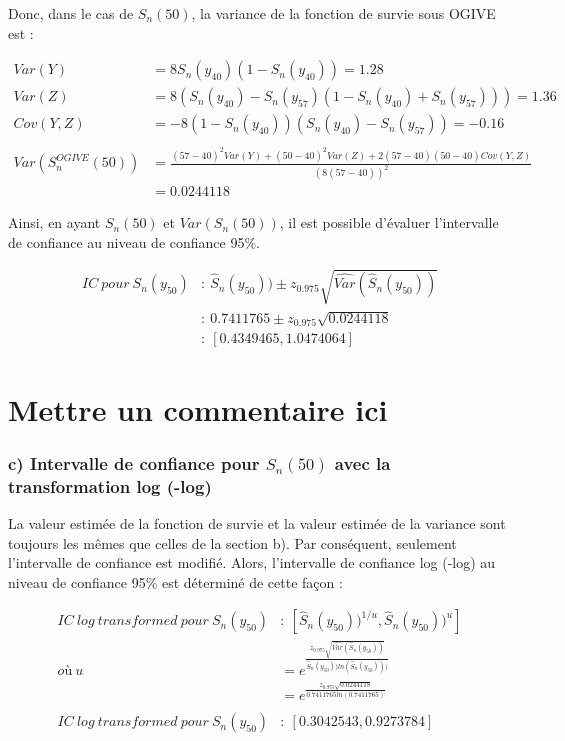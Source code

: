 \documentclass[]{article}
\begin{document}
Donc, dans le cas de \(S_n(50)\), la variance de la fonction de survie
sous OGIVE est :

\begin{align*}
    Var(Y) 
    &= 8 S_n(y_{40}) (1 - S_n(y_{40})) = 1.28 \\
    Var(Z)
    &= 8 (S_n(y_{40}) - S_n(y_{57}) (1 - S_n(y_{40}) + S_n(y_{57}))) = 1.36\\
    Cov(Y,Z)
    &= -8 (1 - S_n(y_{40})) (S_n(y_{40}) - S_n(y_{57})) = -0.16 \\
    \\
    Var(S_n^{OGIVE}(50))
    &= \frac{(57-40)^2Var(Y) + (50-40)^2Var(Z) + 2(57-40)(50-40)Cov(Y,Z)}{(8(57-40))^2} \\
    &= 0.0244118
\end{align*}

\newpage

Ainsi, en ayant \(S_n(50)\) et \(Var(S_n(50))\), il est possible
d'évaluer l'intervalle de confiance au niveau de confiance 95\%.

\begin{align*}
    IC \ pour \ S_n(y_{50})
    &: \ \hat{S}_n(y_{50})) \pm z_{0.975} \sqrt{\widehat{Var}(\hat{S}_n(y_{50}))}\\
    &: \ 0.7411765 \pm z_{0.975} \sqrt{0.0244118} \\
    &: \ [0.4349465, 1.0474064]
\end{align*}

\section{Mettre un commentaire ici}\label{mettre-un-commentaire-ici}

\subsubsection{\texorpdfstring{c) Intervalle de confiance pour
\(S_n(50)\) avec la transformation log
(-log)}{c) Intervalle de confiance pour S\_n(50) avec la transformation log (-log)}}\label{c-intervalle-de-confiance-pour-s_n50-avec-la-transformation-log--log}

La valeur estimée de la fonction de survie et la valeur estimée de la
variance sont toujours les mêmes que celles de la section b). Par
conséquent, seulement l'intervalle de confiance est modifié. Alors,
l'intervalle de confiance log (-log) au niveau de confiance 95\% est
déterminé de cette façon :

\begin{align*}
    IC \ log \ transformed \ pour \ S_n(y_{50})
    &: \ [\hat{S}_n(y_{50}))^{1/u} , \hat{S}_n(y_{50}))^{u}] \\
    où \ u
    &= e^{\frac{z_{0.975} \sqrt{\hat{Var}(\hat{S}_n(y_{50}))}}{\hat{S}_n(y_{50})) ln(\hat{S}_n(y_{50})))}} \\
    &= e^{\frac{z_{0.975} \sqrt{0.0244118}}{0.7411765 ln(0.7411765)}} \\
    \\
    IC \ log \ transformed \ pour \ S_n(y_{50}) 
    &: \ [0.3042543, 0.9273784]
\end{align*}
\end{document}
